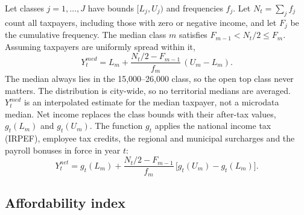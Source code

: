 Let classes $j=1,\dots,J$ have bounds $[L_j,U_j)$ and frequencies $f_j$. Let
$N_t=\sum_j f_j$ count all taxpayers, including those with zero or negative
income, and let $F_j$ be the cumulative frequency. The median class $m$
satisfies $F_{m-1}<N_t/2\le F_m$. Assuming taxpayers are uniformly spread
within it,
\begin{equation}\label{eq:median}
Y^{med}_t = L_m+\frac{N_t/2-F_{m-1}}{f_m}\,(U_m-L_m).
\end{equation}
The median always lies in the \eur{} 15,000--26,000 class, so the open top
class never matters. The distribution is city-wide, so no territorial medians
are averaged. $Y^{med}_t$ is an interpolated estimate for the median
taxpayer, not a microdata median. Net income replaces the class bounds with
their after-tax values, $g_t(L_m)$ and $g_t(U_m)$. The function $g_t$ applies
the national income tax (IRPEF), employee tax credits, the regional and
municipal surcharges and the payroll bonuses in force in year $t$:
\begin{equation}\label{eq:netmedian}
Y^{net}_t = g_t(L_m)+\frac{N_t/2-F_{m-1}}{f_m}\,\bigl[g_t(U_m)-g_t(L_m)\bigr].
\end{equation}

\subsection{Affordability index}\label{sec:index}

